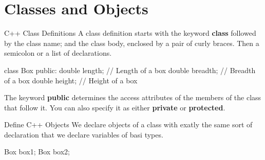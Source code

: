 \documentclass[../lecture5-objectorientation.tex]{subfiles}
\begin{document}
\section{Classes and Objects}


\begin{frame}[fragile]{C++ Class Definitions}
    A class definition starts with the keyword \textbf{class} followed by the class name; and the class body, enclosed by a pair of curly braces. Then a semicolon or a list of declarations.

    \begin{cppcode}[lastline=7]
class Box
{
    public:
        double length;  // Length of a box
        double breadth; // Breadth of a box
        double height;  // Height of a box
}
    \end{cppcode}

    The keyword \textbf{public} determines the access attributes of the members of the class that follow it. You can also specify it as either \textbf{private} or \textbf{protected}.
\end{frame}


\begin{frame}[fragile]{Define C++ Objects}
    We declare objects of a class with exatly the same sort of declaration that we declare variables of basi types.

    \begin{cppcode}[lastline=2]
Box box1;
Box box2;
    \end{cppcode}
\end{frame}

\end{document}
